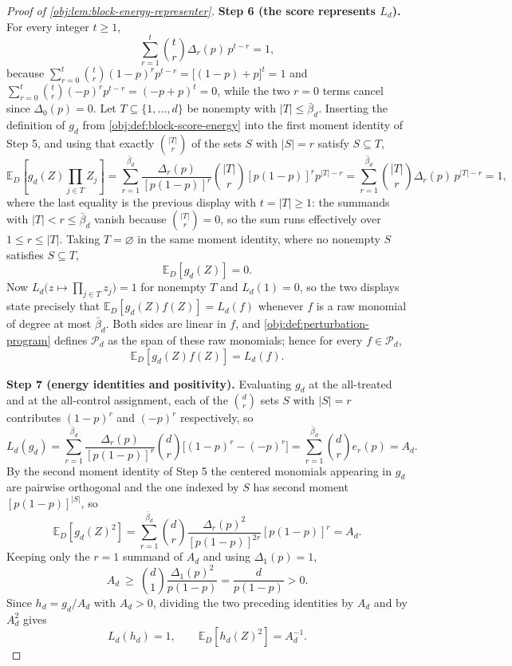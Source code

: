 \begin{proof}[Proof of \cref{obj:lem:block-energy-representer}]
\textbf{Step 6 (the score represents \(L_d\)).}
For every integer \(t\ge1\),
\[
\sum_{r=1}^{t}\binom t r\Delta_r(p)\,p^{t-r}=1,
\]
because \(\sum_{r=0}^{t}\binom t r(1-p)^rp^{t-r}=\bigl[(1-p)+p\bigr]^t=1\) and \(\sum_{r=0}^{t}\binom t r(-p)^rp^{t-r}=(-p+p)^t=0\), while the two \(r=0\) terms cancel since \(\Delta_0(p)=0\). %
Let \(T\subseteq\{1,\ldots,d\}\) be nonempty with \(|T|\le\bar\beta_d\).  Inserting the definition of \(g_d\) from \cref{obj:def:block-score-energy} into the first moment identity of Step 5, and using that exactly \(\binom{|T|}{r}\) of the sets \(S\) with \(|S|=r\) satisfy \(S\subseteq T\),
\[
\mathbb E_D\!\left[g_d(Z)\prod_{j\in T}Z_j\right]
=\sum_{r=1}^{\bar\beta_d}\frac{\Delta_r(p)}{[p(1-p)]^r}\binom{|T|}{r}[p(1-p)]^{r}p^{|T|-r}
=\sum_{r=1}^{\bar\beta_d}\binom{|T|}{r}\Delta_r(p)\,p^{|T|-r}
=1,
\]
where the last equality is the previous display with \(t=|T|\ge1\): the summands with \(|T|<r\le\bar\beta_d\) vanish because \(\binom{|T|}{r}=0\), so the sum runs effectively over \(1\le r\le|T|\). %
Taking \(T=\varnothing\) in the same moment identity, where no nonempty \(S\) satisfies \(S\subseteq T\),
\[
\mathbb E_D[g_d(Z)]=0 .
\]
Now \(L_d\bigl(z\mapsto\prod_{j\in T}z_j\bigr)=1\) for nonempty \(T\) and \(L_d(1)=0\), so the two displays state precisely that \(\mathbb E_D[g_d(Z)f(Z)]=L_d(f)\) whenever \(f\) is a raw monomial of degree at most \(\bar\beta_d\).  Both sides are linear in \(f\), and \cref{obj:def:perturbation-program} defines \(\mathcal P_d\) as the span of these raw monomials; hence for every \(f\in\mathcal P_d\),
\[
\mathbb E_D[g_d(Z)f(Z)]=L_d(f).
\]

\textbf{Step 7 (energy identities and positivity).}
Evaluating \(g_d\) at the all-treated and at the all-control assignment, each of the \(\binom d r\) sets \(S\) with \(|S|=r\) contributes \((1-p)^r\) and \((-p)^r\) respectively, so
\[
L_d(g_d)=\sum_{r=1}^{\bar\beta_d}\frac{\Delta_r(p)}{[p(1-p)]^r}\binom d r\bigl[(1-p)^r-(-p)^r\bigr]
=\sum_{r=1}^{\bar\beta_d}\binom d r e_r(p)=A_d .
\]
By the second moment identity of Step 5 the centered monomials appearing in \(g_d\) are pairwise orthogonal and the one indexed by \(S\) has second moment \([p(1-p)]^{|S|}\), so
\[
\mathbb E_D[g_d(Z)^2]
=\sum_{r=1}^{\bar\beta_d}\binom d r\frac{\Delta_r(p)^2}{[p(1-p)]^{2r}}[p(1-p)]^{r}
=A_d .
\]
Keeping only the \(r=1\) summand of \(A_d\) and using \(\Delta_1(p)=1\),
\[
A_d\ \ge\ \binom d 1\frac{\Delta_1(p)^2}{p(1-p)}=\frac{d}{p(1-p)}>0 .
\]
Since \(h_d=g_d/A_d\) with \(A_d>0\), dividing the two preceding identities by \(A_d\) and by \(A_d^2\) gives
\[
L_d(h_d)=1,
\qquad
\mathbb E_D[h_d(Z)^2]=A_d^{-1}.
\]


\end{proof}
